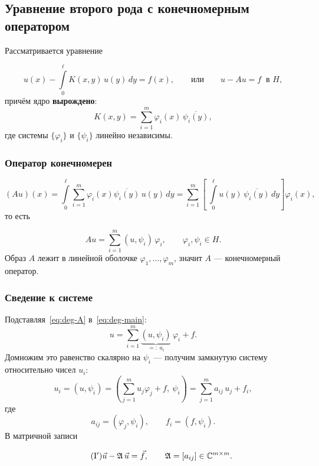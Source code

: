 \subsection{Уравнение второго рода с конечномерным оператором}

Рассматривается уравнение

\begin{equation}\tag{I}\label{eq:deg-main}
  u(x) - \int\limits_{0}^{\ell} K(x,y)\, u(y)\, dy = f(x) ,
  \qquad\text{или}\qquad
  u - Au = f \ \text{ в } H ,
\end{equation}
причём ядро \textbf{вырождено}:
\[
  K(x,y) = \sum_{i=1}^{m} \varphi_i(x)\, \overline{\psi_i(y)} ,
\]
где системы $\{\varphi_i\}$ и $\{\psi_i\}$ линейно независимы.

\subsubsection*{Оператор конечномерен}

\[
  (Au)(x)
  = \int\limits_{0}^{\ell} \sum_{i=1}^{m} \varphi_i(x)\overline{\psi_i(y)}\,
    u(y)\, dy
  = \sum_{i=1}^{m} \left[\ \int\limits_{0}^{\ell} u(y)\,\overline{\psi_i(y)}\,
    dy \right] \varphi_i(x) ,
\]
то есть

\begin{equation}\tag{2}\label{eq:deg-A}
  Au = \sum_{i=1}^{m} (u, \psi_i)\, \varphi_i ,
  \qquad \varphi_i, \psi_i \in H .
\end{equation}
Образ $A$ лежит в линейной оболочке $\varphi_1,\dots,\varphi_m$, значит $A$ —
конечномерный оператор.

\subsubsection*{Сведение к системе}

Подставляя~\eqref{eq:deg-A} в~\eqref{eq:deg-main}:
\[
  u = \sum_{i=1}^{m} \underbrace{(u, \psi_i)}_{=:\ u_i}\, \varphi_i + f .
\]
Домножим это равенство скалярно на $\psi_i$ — получим замкнутую систему
относительно чисел $u_i$:
\[
  u_i = (u, \psi_i)
      = \left(\sum_{j=1}^{m} u_j \varphi_j + f,\ \psi_i\right)
      = \sum_{j=1}^{m} a_{ij}\, u_j + f_i ,
\]
где
\[
  a_{ij} = (\varphi_j, \psi_i) , \qquad f_i = (f, \psi_i) .
\]
В матричной записи

\begin{equation}\tag{I$'$}\label{eq:deg-sys}
  \vec u - \mathfrak{A}\, \vec u = \vec f ,
  \qquad \mathfrak{A} = [a_{ij}] \in \mathbb{C}^{m\times m} .
\end{equation}

